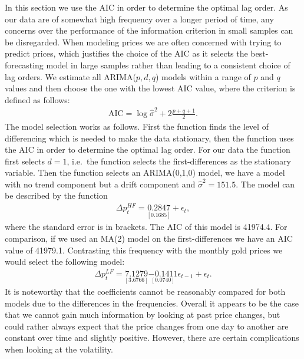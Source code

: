 \documentclass[a4paper]{article}
\theoremstyle{definition}
\begin{document}
In this section we use the AIC in order to determine the optimal lag order. As our data are of somewhat high frequency over a longer period of time, any concerns over the performance of the information criterion in small samples can be disregarded. When modeling prices we are often concerned with trying to predict prices, which justifies the choice of the AIC as it selects the best-forecasting model in large samples rather than leading to a consistent choice of lag orders. We estimate all ARIMA($p,d,q$) models within a range of $p$ and $q$ values and then choose the one with the lowest AIC value, where the criterion is defined as follows:
	\begin{align*}
	\text{AIC} = \log \hat\sigma^2 + 2 \frac{p+q+1}{2}.
	\end{align*}
The model selection works as follows. First the function finds the level of differencing which is needed to make the data stationary, then the function uses the AIC in order to determine the optimal lag order. For our data the function first selects $d=1$, i.e.\ the function selects the first-differences as the stationary variable. Then the function selects an ARIMA(0,1,0) model,  we have a model with no trend component but a drift component and $\hat\sigma^2 = 151.5$. The model can be described by the function
	\begin{align*}
	\Delta p^{HF}_{t} = \underset{[0.1685]}{0.2847} + \epsilon_{t},
	\end{align*}
where the standard error is in brackets. The AIC of this model is 41974.4. For comparison, if we used an MA(2) model on the first-differences we have an AIC value of 41979.1. Contrasting this frequency with the monthly gold prices we would select the following model:
	\begin{align*}
	\Delta p^{LF}_{t} = \underset{[3.6766]}{7.1279}  \underset{[0.0740]}{-0.1411}\epsilon_{t-1} + \epsilon_{t}.
	\end{align*}
It is noteworthy that the coefficients cannot be reasonably compared for both models due to the differences in the frequencies. Overall it appears to be the case that we cannot gain much information by looking at past price changes, but could rather always expect that the price changes from one day to another are constant over time and slightly positive. However, there are certain complications when looking at the volatility. 
\end{document}

